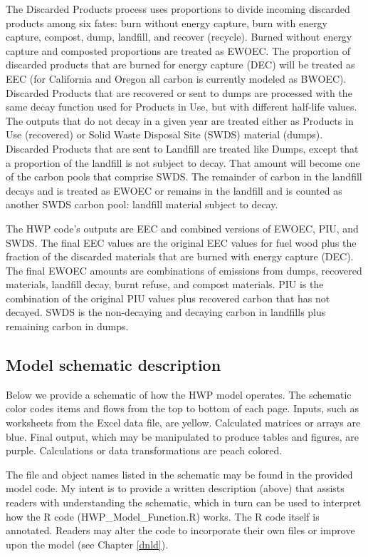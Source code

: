 \documentclass[
  openany]{book}
\begin{document}
The Discarded Products process uses proportions to divide incoming discarded products among six fates: burn without energy capture, burn with energy capture, compost, dump, landfill, and recover (recycle). Burned without energy capture and composted proportions are treated as EWOEC. The proportion of discarded products that are burned for energy capture (DEC) will be treated as EEC (for California and Oregon all carbon is currently modeled as BWOEC). Discarded Products that are recovered or sent to dumps are processed with the same decay function used for Products in Use, but with different half-life values. The outputs that do not decay in a given year are treated either as Products in Use (recovered) or Solid Waste Disposal Site (SWDS) material (dumps). Discarded Products that are sent to Landfill are treated like Dumps, except that a proportion of the landfill is not subject to decay. That amount will become one of the carbon pools that comprise SWDS. The remainder of carbon in the landfill decays and is treated as EWOEC or remains in the landfill and is counted as another SWDS carbon pool: landfill material subject to decay.

The HWP code's outputs are EEC and combined versions of EWOEC, PIU, and SWDS. The final EEC values are the original EEC values for fuel wood plus the fraction of the discarded materials that are burned with energy capture (DEC). The final EWOEC amounts are combinations of emissions from dumps, recovered materials, landfill decay, burnt refuse, and compost materials. PIU is the combination of the original PIU values plus recovered carbon that has not decayed. SWDS is the non-decaying and decaying carbon in landfills plus remaining carbon in dumps.

\hypertarget{model-func-schdesc}{%
\subsection{Model schematic description}\label{model-func-schdesc}}

Below we provide a schematic of how the HWP model operates. The schematic color codes items and flows from the top to bottom of each page. Inputs, such as worksheets from the Excel data file, are yellow. Calculated matrices or arrays are blue. Final output, which may be manipulated to produce tables and figures, are purple. Calculations or data transformations are peach colored.

The file and object names listed in the schematic may be found in the provided model code. My intent is to provide a written description (above) that assists readers with understanding the schematic, which in turn can be used to interpret how the R code (HWP\_Model\_Function.R) works. The R code itself is annotated. Readers may alter the code to incorporate their own files or improve upon the model (see Chapter \ref{dnld}).
\end{document}
